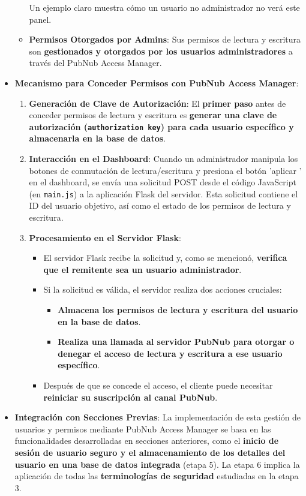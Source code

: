 \documentclass{report}
\begin{document}
\begin{itemize}
\begin{itemize}
        Un ejemplo claro muestra cómo un usuario no administrador no verá este panel.
        \item \textbf{Permisos Otorgados por Admins}: Sus permisos de lectura y escritura son \textbf{gestionados y otorgados por los usuarios 
        administradores} a través del PubNub Access Manager.
    \end{itemize}
    \item \textbf{Mecanismo para Conceder Permisos con PubNub Access Manager}:
    \begin{enumerate}
        \item \textbf{Generación de Clave de Autorización}: El \textbf{primer paso} antes de conceder permisos de lectura y escritura es \textbf{generar una 
        clave de autorización (\texttt{authorization key}) para cada usuario específico y almacenarla en la base de datos}.
        \item \textbf{Interacción en el Dashboard}: Cuando un administrador manipula los botones de conmutación de lectura/escritura y presiona el botón  
        'aplicar ' en el dashboard, se envía una solicitud POST desde el código JavaScript (en \texttt{main.js}) a la aplicación Flask del servidor. Esta 
        solicitud contiene el ID del usuario objetivo, así como el estado de los permisos de lectura y escritura.
        \item \textbf{Procesamiento en el Servidor Flask}:
        \begin{itemize}
            \item El servidor Flask recibe la solicitud y, como se mencionó, \textbf{verifica que el remitente sea un usuario administrador}.
            \item Si la solicitud es válida, el servidor realiza dos acciones cruciales:
            \begin{itemize}
                \item \textbf{Almacena los permisos de lectura y escritura del usuario en la base de datos}.
                \item \textbf{Realiza una llamada al servidor PubNub para otorgar o denegar el acceso de lectura y escritura a ese usuario específico}.
            \end{itemize}
            \item Después de que se concede el acceso, el cliente puede necesitar \textbf{reiniciar su suscripción al canal PubNub}.
        \end{itemize}
    \end{enumerate}
    \item \textbf{Integración con Secciones Previas}: La implementación de esta gestión de usuarios y permisos mediante PubNub Access Manager se basa 
    en las funcionalidades desarrolladas en secciones anteriores, como el \textbf{inicio de sesión de usuario seguro y el almacenamiento de los detalles 
    del usuario en una base de datos integrada} (etapa 5). La etapa 6 implica la aplicación de todas las \textbf{terminologías de seguridad} 
    estudiadas en la etapa 3.
\end{itemize}
\end{document}
